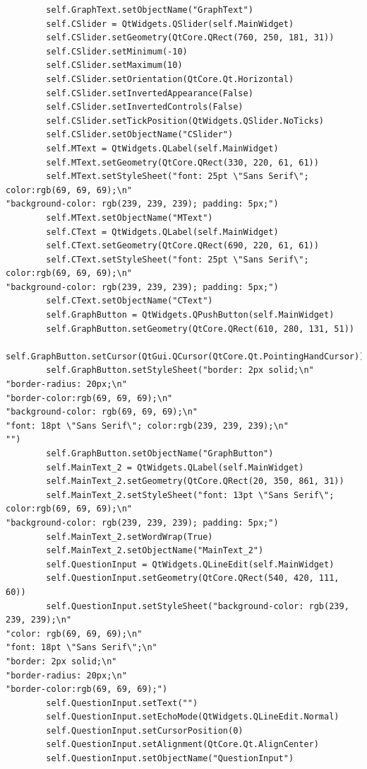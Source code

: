 \documentclass{article}
\begin{document}
\begin{lstlisting}
        self.GraphText.setObjectName("GraphText")
        self.CSlider = QtWidgets.QSlider(self.MainWidget)
        self.CSlider.setGeometry(QtCore.QRect(760, 250, 181, 31))
        self.CSlider.setMinimum(-10)
        self.CSlider.setMaximum(10)
        self.CSlider.setOrientation(QtCore.Qt.Horizontal)
        self.CSlider.setInvertedAppearance(False)
        self.CSlider.setInvertedControls(False)
        self.CSlider.setTickPosition(QtWidgets.QSlider.NoTicks)
        self.CSlider.setObjectName("CSlider")
        self.MText = QtWidgets.QLabel(self.MainWidget)
        self.MText.setGeometry(QtCore.QRect(330, 220, 61, 61))
        self.MText.setStyleSheet("font: 25pt \"Sans Serif\"; color:rgb(69, 69, 69);\n"
"background-color: rgb(239, 239, 239); padding: 5px;")
        self.MText.setObjectName("MText")
        self.CText = QtWidgets.QLabel(self.MainWidget)
        self.CText.setGeometry(QtCore.QRect(690, 220, 61, 61))
        self.CText.setStyleSheet("font: 25pt \"Sans Serif\"; color:rgb(69, 69, 69);\n"
"background-color: rgb(239, 239, 239); padding: 5px;")
        self.CText.setObjectName("CText")
        self.GraphButton = QtWidgets.QPushButton(self.MainWidget)
        self.GraphButton.setGeometry(QtCore.QRect(610, 280, 131, 51))
        self.GraphButton.setCursor(QtGui.QCursor(QtCore.Qt.PointingHandCursor))
        self.GraphButton.setStyleSheet("border: 2px solid;\n"
"border-radius: 20px;\n"
"border-color:rgb(69, 69, 69);\n"
"background-color: rgb(69, 69, 69);\n"
"font: 18pt \"Sans Serif\"; color:rgb(239, 239, 239);\n"
"")
        self.GraphButton.setObjectName("GraphButton")
        self.MainText_2 = QtWidgets.QLabel(self.MainWidget)
        self.MainText_2.setGeometry(QtCore.QRect(20, 350, 861, 31))
        self.MainText_2.setStyleSheet("font: 13pt \"Sans Serif\"; color:rgb(69, 69, 69);\n"
"background-color: rgb(239, 239, 239); padding: 5px;")
        self.MainText_2.setWordWrap(True)
        self.MainText_2.setObjectName("MainText_2")
        self.QuestionInput = QtWidgets.QLineEdit(self.MainWidget)
        self.QuestionInput.setGeometry(QtCore.QRect(540, 420, 111, 60))
        self.QuestionInput.setStyleSheet("background-color: rgb(239, 239, 239);\n"
"color: rgb(69, 69, 69);\n"
"font: 18pt \"Sans Serif\";\n"
"border: 2px solid;\n"
"border-radius: 20px;\n"
"border-color:rgb(69, 69, 69);")
        self.QuestionInput.setText("")
        self.QuestionInput.setEchoMode(QtWidgets.QLineEdit.Normal)
        self.QuestionInput.setCursorPosition(0)
        self.QuestionInput.setAlignment(QtCore.Qt.AlignCenter)
        self.QuestionInput.setObjectName("QuestionInput")

\end{lstlisting}
\end{document}
